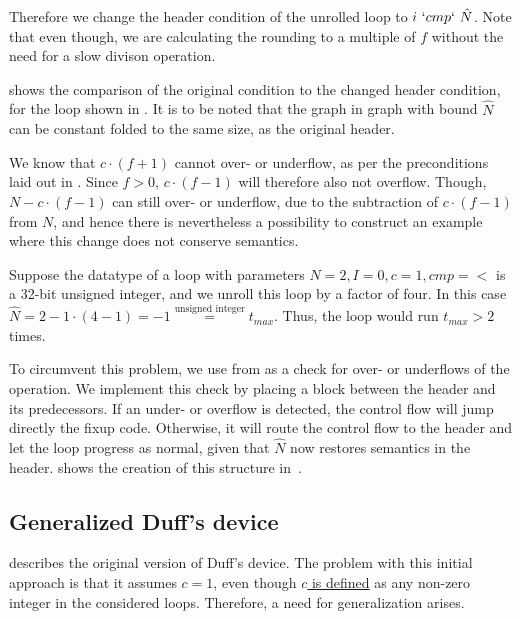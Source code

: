Therefore we change the header condition of the unrolled loop to $i~`cmp`~\hat{N}$.
Note that even though, we are calculating the rounding to a multiple of $f$ without the need for a slow divison operation.

 shows the comparison of the original condition to the changed header condition, for the loop shown in .
It is to be noted that the graph in graph with bound $\hat{N}$ can be constant folded to the same size, as the original header.





We know that $c \cdot (f + 1)$ cannot over- or underflow, as per the preconditions laid out in .
Since $f > 0$, $c \cdot (f - 1)$ will therefore also not overflow.
Though, $N - c \cdot (f - 1)$ can still over- or underflow, due to the subtraction of $c \cdot (f - 1)$ from $N$, and hence there is nevertheless a possibility to construct an example where this change does not conserve semantics.

Suppose the datatype of a loop with parameters $N = 2, I = 0, c = 1, cmp = <$ is a 32-bit unsigned integer, and we unroll this loop by a factor of four.
In this case $\hat{N} = 2 - 1 \cdot (4 - 1) = -1 \overset{\text{unsigned integer}}{=} t_{max}$.
Thus, the loop would run $t_{max} > 2$ times.

To circumvent this problem, we use  from  as a check for over- or underflows of the operation.
We implement this check by placing a block between the header and its predecessors.
If an under- or overflow is detected, the control flow will jump directly the fixup code.
Otherwise, it will route the control flow to the header and let the loop progress as normal, given that $\hat{N}$ now restores semantics in the header.
 shows the creation of this structure in~\libFIRM.



\newpage

\subsection{Generalized Duff's device}\label{sec:impl:fixup:duff}

 describes the original version of Duff's device.
The problem with this initial approach is that it assumes $c = 1$, even though \hyperref[sec:impl::def-c]{$c$ is defined} as any non-zero integer in the considered loops.
Therefore, a need for generalization arises.

